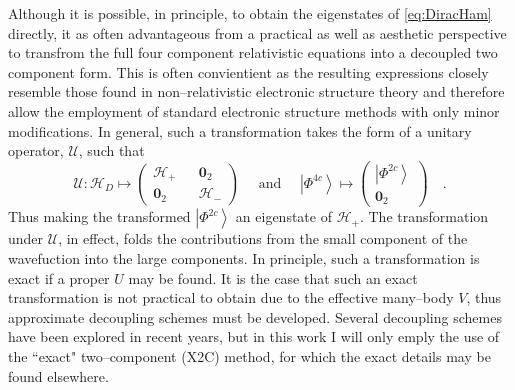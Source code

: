 \documentclass[12pt]{article}
\newcommand{\ket}[1]{\left\vert #1 \right\rangle}         %
\newcommand*\vc[1]{\boldsymbol{#1}}
\newcommand*\op[1]{\mathcal{#1}}
\begin{document}
Although it is possible, in principle, to obtain the eigenstates of
\cref{eq:DiracHam} directly, it as often advantageous from a practical as well
as aesthetic perspective to transfrom the full four component relativistic
equations into a decoupled two component form. This is often convientient as the
resulting expressions closely resemble those found in non--relativistic
electronic structure theory and therefore allow the employment of standard
electronic structure methods with only minor modifications. In general, such a
transformation takes the form of a unitary operator, $\op{U}$, such that
\begin{equation}
\op{U}: 
\op{H}_D \mapsto \begin{pmatrix}
\op{H}_+ && \vc{0}_2 \\ \vc{0}_2 && \op{H}_- 
\end{pmatrix} \quad \text{ and } \quad
\ket{\Phi^{4c}} \mapsto \begin{pmatrix}
 \ket{\Phi^{2c}} \\ \vc{0}_2
\end{pmatrix} \quad.
\end{equation}
Thus making the transformed $\ket{\Phi^{2c}}$ an eigenstate of $\op{H}_+$.
The transformation under $\op{U}$, in effect, folds the contributions from
the small component of the wavefuction into the large components. In principle,
such a transformation is exact if a proper $U$ may be found. It is the case
that such an exact transformation is not practical to obtain due to the
effective many--body $V$, thus approximate decoupling schemes must be developed.
Several decoupling schemes have been explored in recent years, but in this work
I will only emply the use of the ``exact" two--component (X2C) method, for which
the exact details may be found elsewhere.
\end{document}
